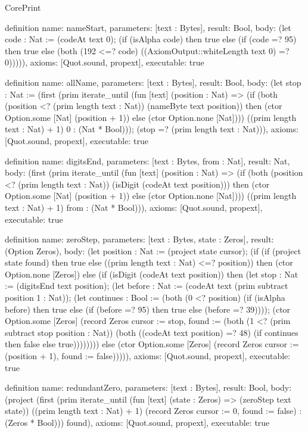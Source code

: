 \begin{lexlean}{CorePrint}
\begin{semanticmodule}
definition{
  name: nameStart,
  parameters: [text : Bytes],
  result: Bool,
  body: (let code : Nat := (codeAt text 0); (if (isAlpha code) then true else (if (code =? 95) then true else (both (192 <=? code) ((AxiomOutput::whiteLength text 0) =? 0))))),
  axioms: [Quot.sound, propext],
  executable: true
}

definition{
  name: allName,
  parameters: [text : Bytes],
  result: Bool,
  body: (let stop : Nat := (first (prim iterate_until (fun [text] (position : Nat) => (if (both (position <? (prim length text : Nat)) (nameByte text position)) then (ctor Option.some [Nat] (position + 1)) else (ctor Option.none [Nat]))) ((prim length text : Nat) + 1) 0 : (Nat * Bool))); (stop =? (prim length text : Nat))),
  axioms: [Quot.sound, propext],
  executable: true
}

definition{
  name: digitsEnd,
  parameters: [text : Bytes, from : Nat],
  result: Nat,
  body: (first (prim iterate_until (fun [text] (position : Nat) => (if (both (position <? (prim length text : Nat)) (isDigit (codeAt text position))) then (ctor Option.some [Nat] (position + 1)) else (ctor Option.none [Nat]))) ((prim length text : Nat) + 1) from : (Nat * Bool))),
  axioms: [Quot.sound, propext],
  executable: true
}

definition{
  name: zeroStep,
  parameters: [text : Bytes, state : Zeros],
  result: (Option Zeros),
  body: (let position : Nat := (project state cursor); (if (if (project state found) then true else ((prim length text : Nat) <=? position)) then (ctor Option.none [Zeros]) else (if (isDigit (codeAt text position)) then (let stop : Nat := (digitsEnd text position); (let before : Nat := (codeAt text (prim subtract position 1 : Nat)); (let continues : Bool := (both (0 <? position) (if (isAlpha before) then true else (if (before =? 95) then true else (before =? 39)))); (ctor Option.some [Zeros] (record Zeros {cursor := stop, found := (both (1 <? (prim subtract stop position : Nat)) (both ((codeAt text position) =? 48) (if continues then false else true)))}))))) else (ctor Option.some [Zeros] (record Zeros {cursor := (position + 1), found := false}))))),
  axioms: [Quot.sound, propext],
  executable: true
}

definition{
  name: redundantZero,
  parameters: [text : Bytes],
  result: Bool,
  body: (project (first (prim iterate_until (fun [text] (state : Zeros) => (zeroStep text state)) ((prim length text : Nat) + 1) (record Zeros {cursor := 0, found := false}) : (Zeros * Bool))) found),
  axioms: [Quot.sound, propext],
  executable: true
}


\end{semanticmodule}
\end{lexlean}
